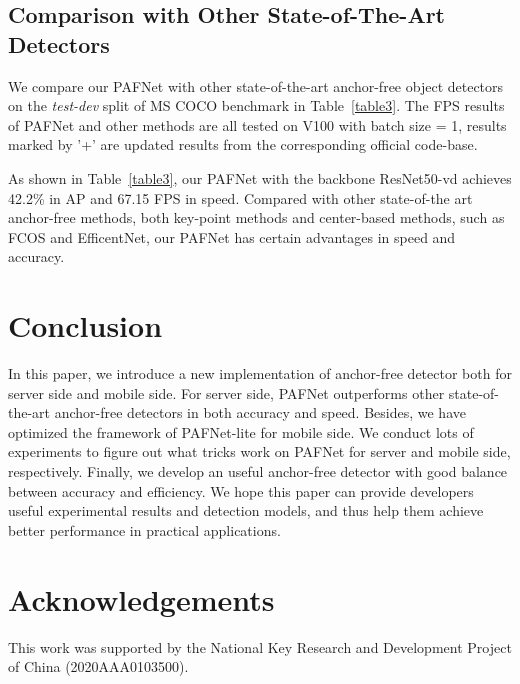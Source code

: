 \documentclass[10pt,twocolumn,letterpaper]{article}
\begin{document}
    \subsection{Comparison with Other State-of-The-Art Detectors}
    We compare our PAFNet with other state-of-the-art anchor-free object detectors on the \textit{test-dev} split of MS COCO benchmark in Table~\ref{table3}. The FPS results of PAFNet and other methods are all tested on V100 with batch size = 1, results marked by '+' are updated results from the corresponding official code-base.
    
    As shown in Table~\ref{table3}, our PAFNet with the backbone ResNet50-vd achieves 42.2\% in AP and 67.15 FPS in speed. Compared with other state-of-the art anchor-free methods, both key-point methods and center-based methods, such as FCOS and EfficentNet, our PAFNet has certain advantages in speed and accuracy.
    




	\section{Conclusion}
	In this paper, we introduce a new implementation of anchor-free detector both for server side and mobile side. 
	For server side, PAFNet outperforms other state-of-the-art anchor-free detectors in both accuracy and speed. 
	Besides, we have optimized the framework of PAFNet-lite for mobile side. We conduct lots of experiments to figure out what tricks work on PAFNet for server and mobile side, respectively. Finally, we develop an useful anchor-free detector with good balance between accuracy and efficiency. We hope this paper can provide developers useful experimental results and detection models, and thus help them achieve better performance in practical applications.

     \section{Acknowledgements}
    This work was supported by the National Key Research and Development Project of China (2020AAA0103500).

	
	
\end{document}
